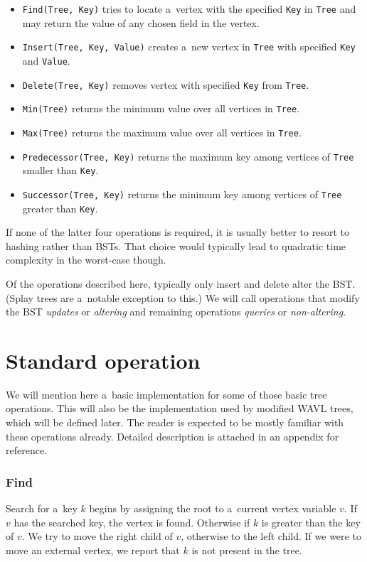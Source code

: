 \begin{itemize}
	\item \texttt{Find(Tree, Key)} tries to locate a~vertex with the specified \texttt{Key} in \texttt{Tree} and may return the value of any chosen field in the vertex.
	\item \texttt{Insert(Tree, Key, Value)} creates a~new vertex in \texttt{Tree} with specified \texttt{Key} and \texttt{Value}.
	\item \texttt{Delete(Tree, Key)} removes vertex with specified \texttt{Key} from \texttt{Tree}.
	\item \texttt{Min(Tree)} returns the minimum value over all vertices in \texttt{Tree}.
	\item \texttt{Max(Tree)} returns the maximum value over all vertices in \texttt{Tree}.
	\item \texttt{Predecessor(Tree, Key)} returns the maximum key among vertices of \texttt{Tree} smaller than \texttt{Key}.
	\item \texttt{Successor(Tree, Key)} returns the minimum key among vertices of \texttt{Tree} greater than \texttt{Key}.
\end{itemize}

If none of the latter four operations is required, it is usually better to resort to hashing rather than BSTs. That choice would typically lead to quadratic time complexity in the worst-case though.

Of the operations described here, typically only insert and delete alter the BST. (Splay trees \cite{splay} are a~notable exception to this.) We will call operations that modify the BST {\em updates} or {\em altering} and remaining operations {\em queries} or {\em non-altering}.

\section{Standard operation}

We will mention here a~basic implementation for some of those basic tree operations. This will also be the implementation used by modified WAVL trees, which will be defined later. The reader is expected to be mostly familiar with these operations already. Detailed description is attached in an appendix for reference.

\subsubsection*{Find}
Search for a~key $k$ begins by assigning the root to a~current vertex variable $v$. If $v$ has the searched key, the vertex is found. Otherwise if $k$ is greater than the key of $v$. We try to move the right child of $v$, otherwise to the left child. If we were to move an external vertex, we report that $k$ is not present in the tree.

